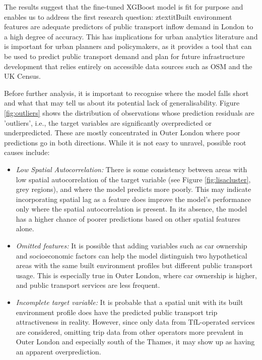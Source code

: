 The results suggest that the fine-tuned XGBoost model is fit for purpose and enables us to address the first research question: ztextit{Built environment features are adequate predictors of public transport inflow demand in London to a high degree of accuracy}. This has implications for urban analytics literature and is important for urban planners and policymakers, as it provides a tool that can be used to predict public transport demand and plan for future infrastructure development that relies entirely on accessible data sources such as OSM and the UK Census.

Before further analysis, it is important to recognise where the model falls short and what that may tell us about its potential lack of generalisability. Figure \ref{fig:outliers} shows the distribution of observations whose prediction residuals are 'outliers', i.e., the target variables are significantly overpredicted or underpredicted. These are mostly concentrated in Outer London where poor predictions go in both directions. While it is not easy to unravel, possible root causes include: 

\begin{itemize}
    \setlength\itemsep{0em}
    \item \textit{Low Spatial Autocorrelation:} There is some consistency between areas with low spatial autocorrelation of the target variable (see Figure \ref{fig:lisacluster}, grey regions), and where the model predicts more poorly. This may indicate incorporating spatial lag as a feature does improve the model's performance only where the spatial autocorrelation is present. In its absence, the model has a higher chance of poorer predictions based on other spatial features alone.
    \item \textit{Omitted features:} It is possible that adding variables such as car ownership and socioeconomic factors can help the model distinguish two hypothetical areas with the same built environment profiles but different public transport usage. This is especially true in Outer London, where car ownership is higher, and public transport services are less frequent.
    \item \textit{Incomplete target variable:} It is probable that a spatial unit with its built environment profile does have the predicted public transport trip attractiveness in reality. However, since only data from TfL-operated services are considered, omitting trip data from other operators more prevalent in Outer London and especially south of the Thames, it may show up as having an apparent overprediction. 
\end{itemize}


